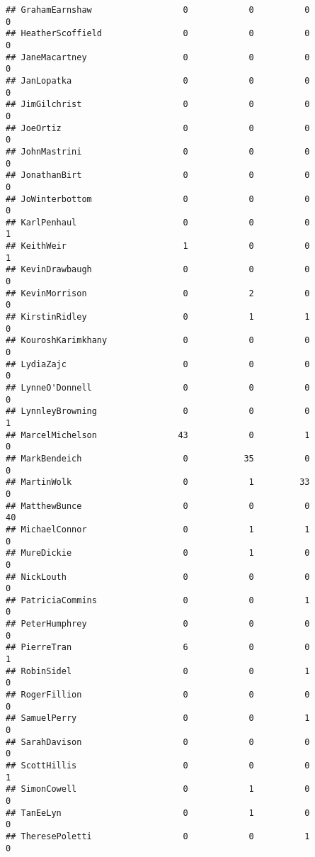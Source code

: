 \documentclass[
  12pt,
]{article}
\begin{document}
\begin{verbatim}
## GrahamEarnshaw                  0            0          0            0
## HeatherScoffield                0            0          0            0
## JaneMacartney                   0            0          0            0
## JanLopatka                      0            0          0            0
## JimGilchrist                    0            0          0            0
## JoeOrtiz                        0            0          0            0
## JohnMastrini                    0            0          0            0
## JonathanBirt                    0            0          0            0
## JoWinterbottom                  0            0          0            0
## KarlPenhaul                     0            0          0            1
## KeithWeir                       1            0          0            1
## KevinDrawbaugh                  0            0          0            0
## KevinMorrison                   0            2          0            0
## KirstinRidley                   0            1          1            0
## KouroshKarimkhany               0            0          0            0
## LydiaZajc                       0            0          0            0
## LynneO'Donnell                  0            0          0            0
## LynnleyBrowning                 0            0          0            1
## MarcelMichelson                43            0          1            0
## MarkBendeich                    0           35          0            0
## MartinWolk                      0            1         33            0
## MatthewBunce                    0            0          0           40
## MichaelConnor                   0            1          1            0
## MureDickie                      0            1          0            0
## NickLouth                       0            0          0            0
## PatriciaCommins                 0            0          1            0
## PeterHumphrey                   0            0          0            0
## PierreTran                      6            0          0            1
## RobinSidel                      0            0          1            0
## RogerFillion                    0            0          0            0
## SamuelPerry                     0            0          1            0
## SarahDavison                    0            0          0            0
## ScottHillis                     0            0          0            1
## SimonCowell                     0            1          0            0
## TanEeLyn                        0            1          0            0
## TheresePoletti                  0            0          1            0

\end{verbatim}
\end{document}
